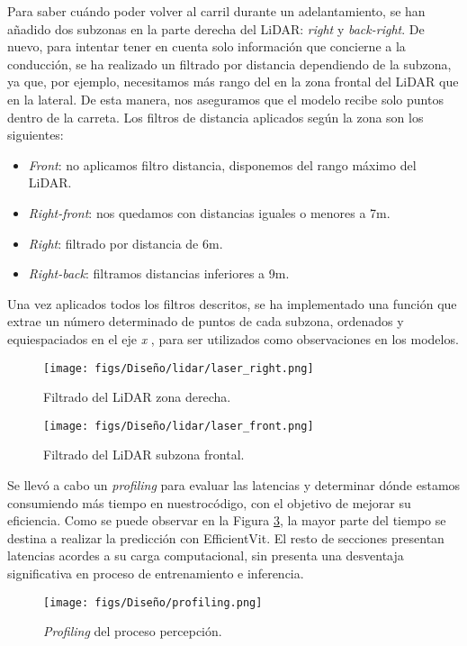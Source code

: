 Para saber cuándo poder volver al carril durante un adelantamiento, se han añadido dos subzonas en la parte derecha del \ac{LiDAR}: \textit{right} y \textit{back-right}. De nuevo, para intentar tener en cuenta solo información que concierne a la conducción, se ha realizado un filtrado por distancia dependiendo de la subzona, ya que, por ejemplo, necesitamos más rango del en la zona frontal del \ac{LiDAR} que en la lateral. De esta manera, nos aseguramos que el modelo recibe solo puntos dentro de la carreta. Los filtros de distancia aplicados según la zona son los siguientes:
    \begin{itemize}
        \item \textit{Front}: no aplicamos filtro distancia, disponemos del rango máximo del \ac{LiDAR}.
        \item \textit{Right-front}: nos quedamos con distancias iguales o menores a 7m.
        \item \textit{Right}: filtrado por distancia de 6m.
        \item \textit{Right-back}: filtramos distancias inferiores a 9m.
    \end{itemize}

Una vez aplicados todos los filtros descritos, se ha implementado una función que extrae un número determinado de puntos de cada subzona, ordenados y equiespaciados en el eje \textit{x} , para ser utilizados como observaciones en los modelos.
\begin{figure}[ht]
  \centering
  \texttt{[image: figs/Diseño/lidar/laser\_right.png]}
  \caption{Filtrado del \ac{LiDAR} zona derecha.}
  \label{fig:laser_right}
\end{figure}

\begin{figure}[ht]
  \centering
  \texttt{[image: figs/Diseño/lidar/laser\_front.png]}
  \caption{Filtrado del \ac{LiDAR} subzona frontal.}
  \label{fig:laser_front}
\end{figure}

Se llevó a cabo un \textit{profiling} para evaluar las latencias y determinar dónde estamos consumiendo más tiempo en nuestrocódigo, con el objetivo de mejorar su eficiencia. Como se puede observar en la Figura \ref{fig:profiling}, la mayor parte del tiempo se destina a realizar la predicción con EfficientVit. El resto de secciones presentan latencias acordes a su carga computacional, sin presenta una desventaja significativa en proceso de entrenamiento e inferencia.
\begin{figure}[ht]
  \centering
  \texttt{[image: figs/Diseño/profiling.png]}
  \caption{\textit{Profiling} del proceso percepción.}
  \label{fig:profiling}
\end{figure}

